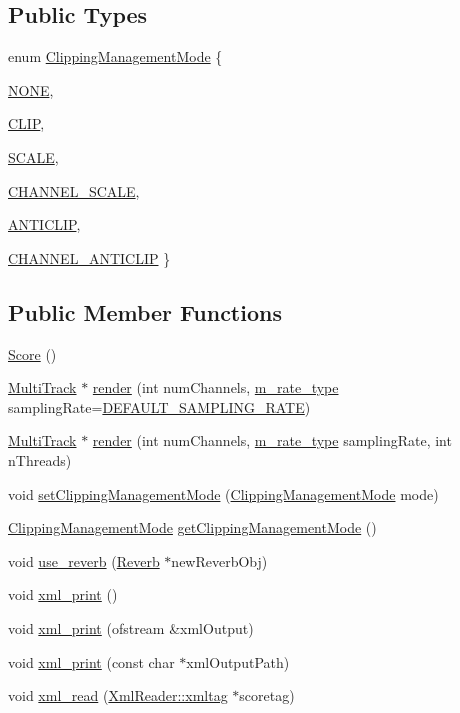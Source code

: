 \subsection*{Public Types}
\begin{CompactItemize}
\item 
enum \hyperlink{classScore_w6}{Clipping\-Management\-Mode} \{ \par
\hyperlink{classScore_w6w0}{NONE}, 
\par
\hyperlink{classScore_w6w1}{CLIP}, 
\par
\hyperlink{classScore_w6w2}{SCALE}, 
\par
\hyperlink{classScore_w6w3}{CHANNEL\_\-SCALE}, 
\par
\hyperlink{classScore_w6w4}{ANTICLIP}, 
\par
\hyperlink{classScore_w6w5}{CHANNEL\_\-ANTICLIP}
 \}
\end{CompactItemize}
\subsection*{Public Member Functions}
\begin{CompactItemize}
\item 
\hyperlink{classScore_a0}{Score} ()
\item 
\hyperlink{classMultiTrack}{Multi\-Track} $\ast$ \hyperlink{classScore_a1}{render} (int num\-Channels, \hyperlink{Types_8h_a4}{m\_\-rate\_\-type} sampling\-Rate=\hyperlink{Types_8h_a5}{DEFAULT\_\-SAMPLING\_\-RATE})
\item 
\hyperlink{classMultiTrack}{Multi\-Track} $\ast$ \hyperlink{classScore_a2}{render} (int num\-Channels, \hyperlink{Types_8h_a4}{m\_\-rate\_\-type} sampling\-Rate, int n\-Threads)
\item 
void \hyperlink{classScore_a3}{set\-Clipping\-Management\-Mode} (\hyperlink{classScore_w6}{Clipping\-Management\-Mode} mode)
\item 
\hyperlink{classScore_w6}{Clipping\-Management\-Mode} \hyperlink{classScore_a4}{get\-Clipping\-Management\-Mode} ()
\item 
void \hyperlink{classScore_a5}{use\_\-reverb} (\hyperlink{classReverb}{Reverb} $\ast$new\-Reverb\-Obj)
\item 
void \hyperlink{classScore_a6}{xml\_\-print} ()
\item 
void \hyperlink{classScore_a7}{xml\_\-print} (ofstream \&xml\-Output)
\item 
void \hyperlink{classScore_a8}{xml\_\-print} (const  char $\ast$xml\-Output\-Path)
\item 
void \hyperlink{classScore_a9}{xml\_\-read} (\hyperlink{classXmlReader_1_1xmltag}{Xml\-Reader::xmltag} $\ast$scoretag)
\end{CompactItemize}
